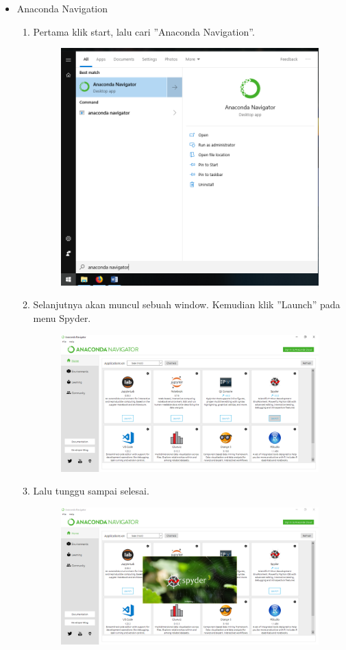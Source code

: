 \begin{itemize}
\begin{enumerate}
	\end{enumerate}
	\item Anaconda Navigation

	\begin{enumerate}
		\item Pertama klik start, lalu cari ''Anaconda Navigation''.
		\begin{figure}[H]
			\includegraphics[width=10cm]{figures/diva/14chp1diva.png}
			\centering
		\end{figure}
		\item Selanjutnya akan muncul sebuah window. Kemudian klik ''Launch'' pada menu Spyder.
		\begin{figure}[H]
			\includegraphics[width=10cm]{figures/diva/15chp1diva.png}
			\centering
		\end{figure}
		\item Lalu tunggu sampai selesai.
		\begin{figure}[H]
			\includegraphics[width=10cm]{figures/diva/16chp1diva.png}
			\centering
		\end{figure}

	\end{enumerate}
\end{itemize}

